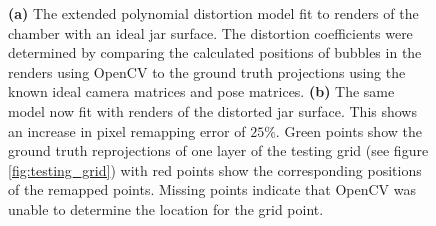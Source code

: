 \documentclass[11pt, letterpaper]{extarticle} %
\begin{document}
\begin{figure}[h]
    \centering
    \hfill
    \caption{\textbf{(a)} The extended polynomial distortion model fit to renders of the chamber with an ideal jar surface. The distortion coefficients were determined by comparing the calculated positions of bubbles in the renders using OpenCV to the ground truth projections using the known ideal camera matrices and pose matrices. \textbf{(b)} The same model now fit with renders of the distorted jar surface. This shows an increase in pixel remapping error of $25\%$. Green points show the ground truth reprojections of one layer of the testing grid (see figure \ref{fig:testing_grid}) with red points show the corresponding positions of the remapped points. Missing points indicate that OpenCV was unable to determine the location for the grid point.}
    \label{fig:extended_polynomial_fit_to_ideal_distorted_jar}
\end{figure}
\end{document}
